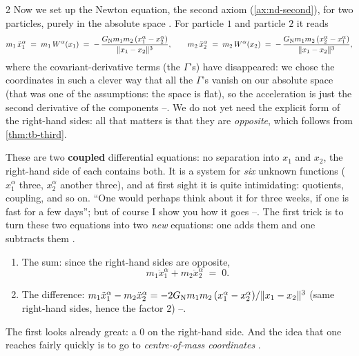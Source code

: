 \begin{paracol}{2}
Now we set up the Newton equation, the second axiom (\cref{ax:nd-second}), for two particles, purely in the absolute space . For particle $1$ and particle $2$ it reads
\begin{equation}\label{eq:tb-eom}
  m_1\,\ddot x_1^{\alpha}\;=\;m_1\,W^\alpha(x_1)\;=\;-\,\frac{G_{\rm N}m_1m_2\,(x_1^\alpha-x_2^\alpha)}{\|x_1-x_2\|^3},\qquad
  m_2\,\ddot x_2^{\alpha}\;=\;m_2\,W^\alpha(x_2)\;=\;-\,\frac{G_{\rm N}m_1m_2\,(x_2^\alpha-x_1^\alpha)}{\|x_1-x_2\|^3},
\end{equation}
where the covariant-derivative terms (the $\Gamma$'s) have disappeared: we chose the coordinates in such a clever way that all the $\Gamma$'s vanish on our absolute space (that was one of the assumptions: the space is flat), so the acceleration is just the second derivative of the components --.
We do not yet need the explicit form of the right-hand sides: all that matters is that they are \emph{opposite}, which follows from \cref{thm:tb-third}.

These are two \textbf{coupled} differential equations: no separation into $x_1$ and $x_2$, the right-hand side of each contains both. It is a system for \emph{six} unknown functions ($x_1^\alpha$ three, $x_2^\alpha$ another three), and at first sight it is quite intimidating: quotients, coupling, and so on. ``One would perhaps think about it for three weeks, if one is fast for a few days''; but of course I show you how it goes --.
The first trick is to turn these two equations into two \emph{new} equations: one adds them and one subtracts them .

\begin{enumerate}
  \item The sum: since the right-hand sides are opposite,
        \begin{equation}\label{eq:tb-sum}
          m_1\ddot x_1^\alpha+m_2\ddot x_2^\alpha\;=\;0 .
        \end{equation}
  \item The difference: $m_1\ddot x_1^\alpha-m_2\ddot x_2^\alpha=-2G_{\rm N}m_1m_2\,(x_1^\alpha-x_2^\alpha)/\|x_1-x_2\|^3$ (same right-hand sides, hence the factor $2$) --.
\end{enumerate}
The first looks already great: a $0$ on the right-hand side. And the idea that one reaches fairly quickly is to go to \emph{centre-of-mass coordinates} .


\end{paracol}
